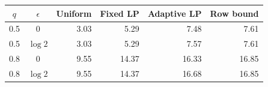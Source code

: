 \begin{tabular}{ccrrrr}
\toprule
$q$ & $\epsilon$ & Uniform & Fixed LP & Adaptive LP & Row bound \\
\midrule
0.5 & $0$ & 3.03 & 5.29 & 7.48 & 7.61 \\
0.5 & $\log 2$ & 3.03 & 5.29 & 7.57 & 7.61 \\
0.8 & $0$ & 9.55 & 14.37 & 16.33 & 16.85 \\
0.8 & $\log 2$ & 9.55 & 14.37 & 16.68 & 16.85 \\
\bottomrule
\end{tabular}
